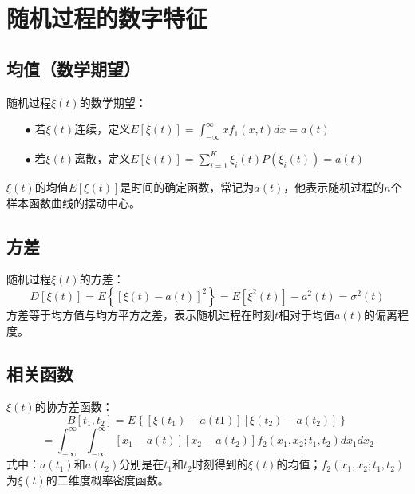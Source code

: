 \documentclass[12pt,a4paper,oneside]{ctexart}
\begin{document}
\section{随机过程的数字特征}
\subsection{均值（数学期望）}
\indent 随机过程$\xi(t)$的数学期望：
    \begin{itemize}
        \item [$\bullet$] 若$\xi(t)$连续，定义$E[\xi(t)] = \int_{-\infty }^{\infty } xf_{1}(x,t)dx = a(t)$
        \item [$\bullet$] 若$\xi(t)$离散，定义$E[\xi(t)] =  {\textstyle \sum_{i=1}^{K}}\xi_{i}(t)P(\xi_{i}(t))=a(t)$ 
    \end{itemize}
\indent \indent $\xi (t)$的均值$E\left [ \xi(t) \right ] $是时间的确定函数，常记为$a(t)$，他表示随机过程的$n$个样本函数曲线的摆动中心。\\
\subsection{方差}
\indent 随机过程$\xi(t)$的方差：
$$
D\left[\xi(t)\right] = E\left\{\left[\xi(t)-a(t)\right]^{2}\right\} = E[\xi^{2}(t)] - a^{2}(t) = \sigma^{2}(t)
$$
\indent 方差等于均方值与均方平方之差，表示随机过程在时刻$t$相对于均值$a(t)$的偏离程度。
\subsection{相关函数}
\indent $\xi(t)$的协方差函数：
$$
B[t_{1},t_{2}] = E\left\{[\xi(t_{1}) - a(t1)][\xi(t_{2}) - a(t_{2})]\right\} 
$$
$$
= \int_{-\infty }^{\infty } \int_{-\infty}^{\infty}[x_{1} - a(t)][x_{2} - a(t_{2})]f_{2}(x_{1},x_{2};t_{1},t_{2})dx_{1}dx_{2}
$$
\indent 式中：$a(t_{1})$和$a(t_{2})$分别是在$t_{1}$和$t_{2}$时刻得到的$\xi(t)$的均值；$f_{2}(x_{1},x_{2};t_{1},t_{2})$为$\xi(t)$的二维度概率密度函数。
\end{document}
